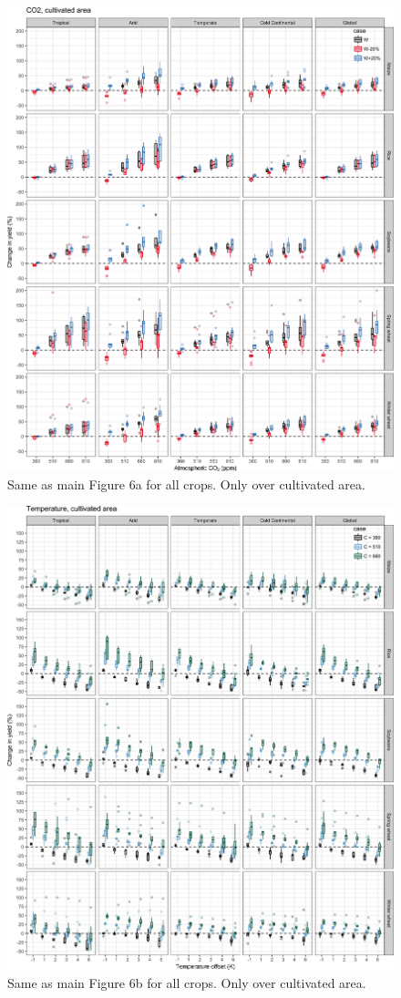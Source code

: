 \documentclass[10pt]{article}
\begin{document}
\begin{figure}[h!]
\centering
\includegraphics[width=\textwidth]{s_sim_CG_C_area.png}
\caption{Same as main Figure 6a for all crops. Only over cultivated area.}
\label{fig:carbon}
\end{figure}

\begin{figure}[h!]
\centering
\includegraphics[width=\textwidth]{s_sim_CG_TC_area.png}
\caption{Same as main Figure 6b for all crops. Only over cultivated area.}
\label{fig:carbontemp}
\end{figure}
\end{document}
